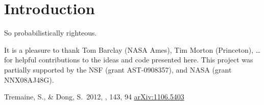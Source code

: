 \documentclass[12pt,preprint]{aastex}
\begin{document}
\section{Introduction}

So probabilistically righteous.

\acknowledgments
It is a pleasure to thank
    Tom Barclay (NASA Ames),
    Tim Morton (Princeton),
    \ldots
for helpful contributions to the ideas and code presented here.
This project was partially supported by the NSF (grant AST-0908357), and NASA
(grant NNX08AJ48G).

\newcommand{\arxiv}[1]{\href{http://arxiv.org/abs/#1}{arXiv:#1}}
\begin{thebibliography}{}\raggedright

Tremaine, S., \& Dong, S.\ 2012, \aj, 143, 94
\arxiv{1106.5403}

\end{thebibliography}
\end{document}
